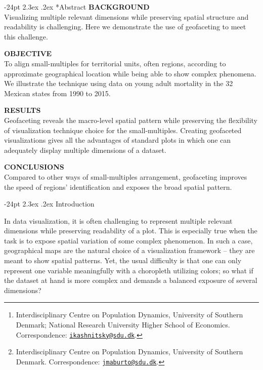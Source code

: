 \documentclass[10pt, twoside, parskip=half]{article}
\title{\large\textbf{Geofaceting -- align small-multiples for regions in a spatially meaningful way}\vskip 0em}
\author{\normalsize\textrm{\textbf{Ilya Kashnitsky\footnote{Interdisciplinary Centre on Population Dynamics, University of Southern Denmark; National Research University Higher School of Economics. Correspondence: \href{mailto:ikashnitsky@sdu.dk}{\nolinkurl{ikashnitsky@sdu.dk}}.}}}\\\normalsize\textrm{\textbf{José Manuel Aburto\footnote{Interdisciplinary Centre on Population Dynamics, University of Southern Denmark. Correspondence: \href{mailto:jmaburto@sdu.dk}{\nolinkurl{jmaburto@sdu.dk}}.}}}}
\date{\vspace{-5ex}}
\makeatletter
\renewcommand\section{\@startsection {section}{1}{\z@}%
                                   {-24pt}%
                                   {2.3ex \@plus.2ex}%
                                   {\normalfont\large\bfseries}}
\makeatother
\begin{document}
  \maketitle

\vspace*{-24pt}
\vspace*{5mm}
\setlength{\parskip}{0.5em}
\section*{Abstract}
  \noindent\textbf{BACKGROUND}\\
  Visualizing multiple relevant dimensions while preserving spatial structure and readability is challenging. Here we demonstrate the use of geofaceting to meet this challenge.
  \par
  \noindent\textbf{OBJECTIVE}\\
  To align small-multiples for territorial units, often regions, according to approximate geographical location while being able to show complex phenomena. We illustrate the technique using data on young adult mortality in the 32 Mexican states from 1990 to 2015.
  \par
  \noindent\textbf{RESULTS}\\
  Geofaceting reveals the macro-level spatial pattern while preserving the flexibility of visualization technique choice for the small-multiples. Creating geofaceted visualizations gives all the advantages of standard plots in which one can adequately display multiple dimensions of a dataset.
  \par
  \noindent\textbf{CONCLUSIONS}\\
  Compared to other ways of small-multiples arrangement, geofaceting improves the speed of regions' identification and exposes the broad spatial pattern.
  \par
\vspace*{12pt}

\setlength{\parskip}{0ex}

\newpage

\hypertarget{introduction}{%
\section{Introduction}\label{introduction}}

In data visualization, it is often challenging to represent multiple relevant dimensions while preserving readability of a plot. This is especially true when the task is to expose spatial variation of some complex phenomenon. In such a case, geographical maps are the natural choice of a visualization framework -- they are meant to show spatial patterns. Yet, the usual difficulty is that one can only represent one variable meaningfully with a choropleth utilizing colors; so what if the dataset at hand is more complex and demands a balanced exposure of several dimensions?
\end{document}

